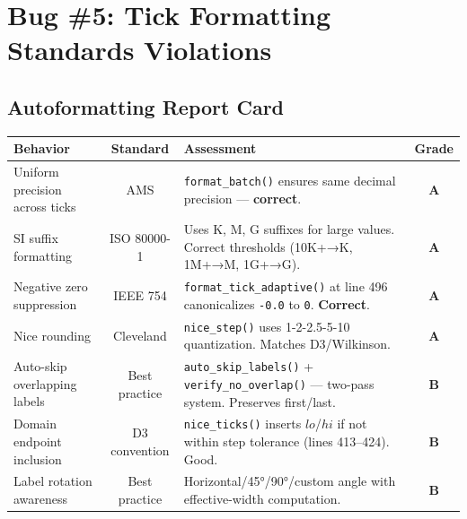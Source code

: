 \documentclass[11pt,a4paper]{article}
\begin{document}
\section{Bug \#5: Tick Formatting Standards Violations}
\label{sec:ticks}

\subsection{Autoformatting Report Card}

\begin{longtable}{p{3.5cm} c p{5.5cm} c}
\toprule
\textbf{Behavior} & \textbf{Standard} & \textbf{Assessment} & \textbf{Grade} \\
\midrule
Uniform precision across ticks & AMS & \texttt{format\_batch()} ensures
  same decimal precision — \textbf{correct}. & \textcolor{okgreen}{\textbf{A}} \\[4pt]

SI suffix formatting & ISO 80000-1 & Uses K, M, G suffixes for large
  values. Correct thresholds (10K+→K, 1M+→M, 1G+→G). & \textcolor{okgreen}{\textbf{A}} \\[4pt]

Negative zero suppression & IEEE 754 & \texttt{format\_tick\_adaptive()}
  at line 496 canonicalizes \texttt{-0.0} to \texttt{0}. \textbf{Correct}. &
  \textcolor{okgreen}{\textbf{A}} \\[4pt]

Nice rounding & Cleveland & \texttt{nice\_step()} uses 1-2-2.5-5-10
  quantization. Matches D3/Wilkinson. & \textcolor{okgreen}{\textbf{A}} \\[4pt]

Auto-skip overlapping labels & Best practice & \texttt{auto\_skip\_labels()}
  + \texttt{verify\_no\_overlap()} — two-pass system. Preserves first/last. &
  \textcolor{googblue}{\textbf{B}} \\[4pt]

Domain endpoint inclusion & D3 convention & \texttt{nice\_ticks()} inserts
  $lo$/$hi$ if not within step tolerance (lines 413--424). Good. &
  \textcolor{googblue}{\textbf{B}} \\[4pt]

Label rotation awareness & Best practice & Horizontal/45°/90°/custom angle
  with effective-width computation. & \textcolor{googblue}{\textbf{B}} \\[4pt]

\midrule


\end{longtable}
\end{document}
